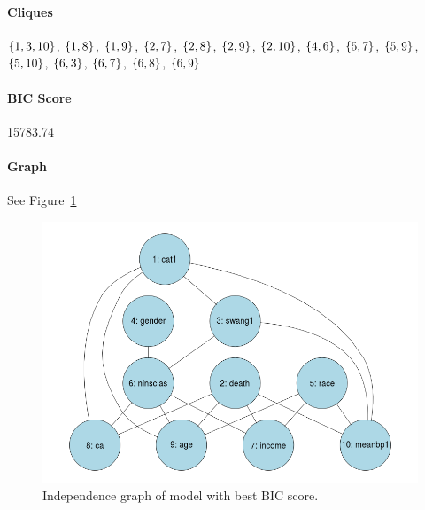 \documentclass[12pt]{article}
\theoremstyle{definition}
\begin{document}
\paragraph{Cliques}
$\set{1,3,10}$, $\set{1,8}$, $\set{1,9}$, $\set{2,7}$, $\set{2,8}$, $\set{2,9}$,
$\set{2,10}$, $\set{4,6}$, $\set{5,7}$, $\set{5,9}$, $\set{5,10}$, $\set{6,3}$,
$\set{6,7}$, $\set{6,8}$, $\set{6,9}$

\paragraph{BIC Score} 15783.74

\paragraph{Graph} See Figure~\ref{fig:best}

\begin{figure}[H]
    \centering
    \includegraphics[width=0.8\linewidth]{best.png}
    \caption{Independence graph of model with best BIC score.}
\label{fig:best}
\end{figure}
\end{document}
